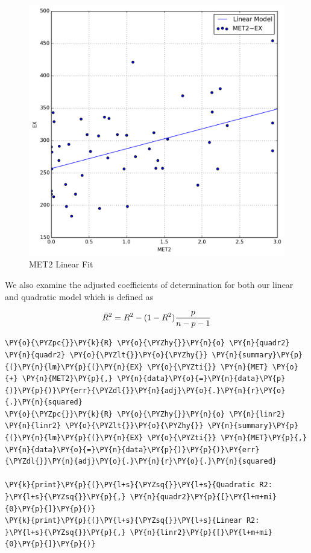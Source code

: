 \documentclass[10pt]{article}\usepackage[]{graphicx}\usepackage[]{xcolor}
\begin{document}
    \begin{figure}[H]
        \centering
        \includegraphics[scale=0.6]{./img/squarefit.png}
        \caption{MET2 Linear Fit}
        \label{fig:met2fit}
    \end{figure}
    
    We also examine the adjusted coefficients of determination for both our
linear and quadratic model which is defined as

\begin{equation}
\bar R^2 = {R^{2}-(1-R^{2}){p \over n-p-1}}
\end{equation}

\begin{Verbatim}[commandchars=\\\{\}]
\PY{o}{\PYZpc{}}\PY{k}{R} \PY{o}{\PYZhy{}}\PY{n}{o} \PY{n}{quadr2} \PY{n}{quadr2} \PY{o}{\PYZlt{}}\PY{o}{\PYZhy{}} \PY{n}{summary}\PY{p}{(}\PY{n}{lm}\PY{p}{(}\PY{n}{EX} \PY{o}{\PYZti{}} \PY{n}{MET} \PY{o}{+} \PY{n}{MET2}\PY{p}{,} \PY{n}{data}\PY{o}{=}\PY{n}{data}\PY{p}{)}\PY{p}{)}\PY{err}{\PYZdl{}}\PY{n}{adj}\PY{o}{.}\PY{n}{r}\PY{o}{.}\PY{n}{squared}
\PY{o}{\PYZpc{}}\PY{k}{R} \PY{o}{\PYZhy{}}\PY{n}{o} \PY{n}{linr2} \PY{n}{linr2} \PY{o}{\PYZlt{}}\PY{o}{\PYZhy{}} \PY{n}{summary}\PY{p}{(}\PY{n}{lm}\PY{p}{(}\PY{n}{EX} \PY{o}{\PYZti{}} \PY{n}{MET}\PY{p}{,} \PY{n}{data}\PY{o}{=}\PY{n}{data}\PY{p}{)}\PY{p}{)}\PY{err}{\PYZdl{}}\PY{n}{adj}\PY{o}{.}\PY{n}{r}\PY{o}{.}\PY{n}{squared}

\PY{k}{print}\PY{p}{(}\PY{l+s}{\PYZsq{}}\PY{l+s}{Quadratic R2:  }\PY{l+s}{\PYZsq{}}\PY{p}{,} \PY{n}{quadr2}\PY{p}{[}\PY{l+m+mi}{0}\PY{p}{]}\PY{p}{)}
\PY{k}{print}\PY{p}{(}\PY{l+s}{\PYZsq{}}\PY{l+s}{Linear R2:    }\PY{l+s}{\PYZsq{}}\PY{p}{,} \PY{n}{linr2}\PY{p}{[}\PY{l+m+mi}{0}\PY{p}{]}\PY{p}{)}
\end{Verbatim}
\end{document}
